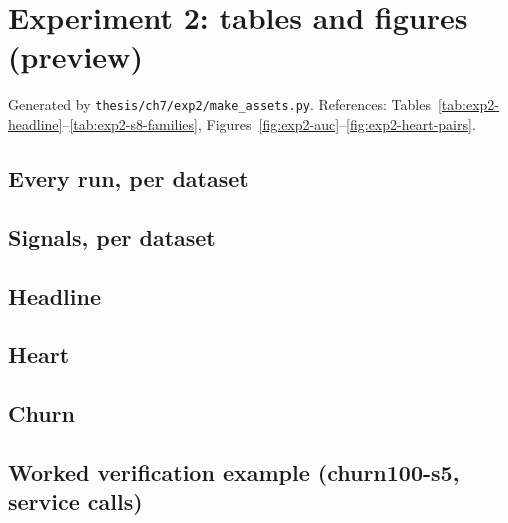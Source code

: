 \documentclass[a4paper,12pt,openany]{book}
\begin{document}
\chapter*{Experiment 2: tables and figures (preview)}
Generated by \texttt{thesis/ch7/exp2/make\_assets.py}. References:
Tables~\ref{tab:exp2-headline}--\ref{tab:exp2-s8-families}, Figures~\ref{fig:exp2-auc}--\ref{fig:exp2-heart-pairs}.

\section*{Every run, per dataset}



\clearpage
\section*{Signals, per dataset}



\clearpage
\section*{Headline}



\clearpage
\section*{Heart}








\clearpage
\section*{Churn}








\clearpage
\section*{Worked verification example (churn100-s5, service calls)}






\end{document}
